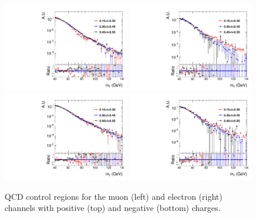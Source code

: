 \begin{figure}[htb]
\centering
\includegraphics[width=0.49\textwidth]{plots/W/mt_qcd_shape_muon_wp.pdf}
\includegraphics[width=0.49\textwidth]{plots/W/mt_qcd_shape_electron_wp.pdf}
\includegraphics[width=0.49\textwidth]{plots/W/mt_qcd_shape_muon_wm.pdf}
\includegraphics[width=0.49\textwidth]{plots/W/mt_qcd_shape_electron_wm.pdf}
\caption{QCD control regions for the muon (left) and electron (right) channels with positive  (top) and negative (bottom) charges.}
\label{fig:qcd:control}
\end{figure}